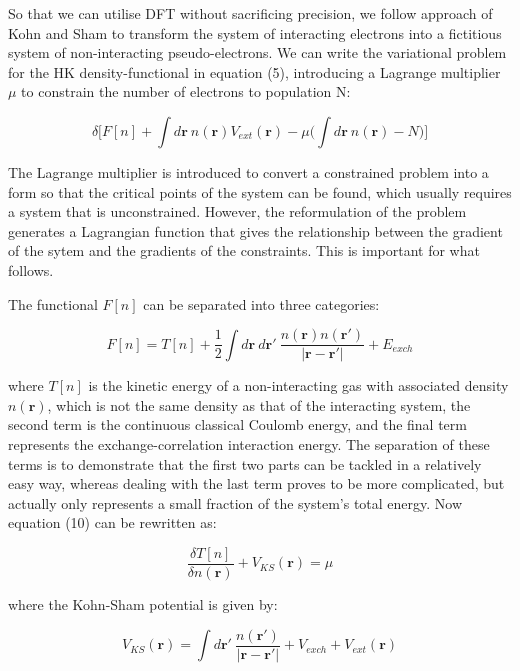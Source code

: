 \documentclass[10pt]{article}
\begin{document}
So that we can utilise DFT without sacrificing precision, we follow approach of Kohn and Sham \cite{kohn1965self} to transform the system of interacting electrons into a fictitious system of non-interacting pseudo-electrons. We can write the variational problem for the HK density-functional in equation (5), introducing a Lagrange multiplier $\mu$ to constrain the number of electrons to population N:

\begin{equation}
	\delta\biggr[F[n]+\int d\mathbf{r} \ n(\mathbf{r})V_{ext}(\mathbf{r}) - \mu\biggr(\int d\mathbf{r} \ n(\mathbf{r}) - N\biggr)\biggr]
\end{equation}

The Lagrange multiplier is introduced to convert a constrained problem into a form so that the critical points of the system can be found, which usually requires a system that is unconstrained. However, the reformulation of the problem generates a Lagrangian function that gives the relationship between the gradient of the sytem and the gradients of the constraints. This is important for what follows.

The functional $F[n]$ can be separated into three categories:

\begin{equation*}
	F[n] = T[n]+\frac{1}{2}\int d\mathbf{r} \ d\mathbf{r}' \ \frac{n(\mathbf{r})n(\mathbf{r}')}{|\mathbf{r}-\mathbf{r}'|}+E_{exch}
\end{equation*}

where $T[n]$ is the kinetic energy of a non-interacting gas with associated density $n(\mathbf{r})$, which is not the same density as that of the interacting system, the second term is the continuous classical Coulomb energy, and the final term represents the exchange-correlation interaction energy. The separation of these terms is to demonstrate that the first two parts can be tackled in a relatively easy way, whereas dealing with the last term proves to be more complicated, but actually only represents a small fraction of the system's total energy. Now equation (10) can be rewritten as:

\begin{equation}
	\frac{\delta T[n]}{\delta n(\mathbf{r})} + V_{KS}(\mathbf{r}) = \mu
\end{equation}

where the Kohn-Sham potential is given by:

\begin{equation*}
	V_{KS}(\mathbf{r}) = \int d\mathbf{r}' \ \frac{n(\mathbf{r}')}{|\mathbf{r}-\mathbf{r}'|}+V_{exch}+V_{ext}(\mathbf{r})
\end{equation*}
\end{document}
